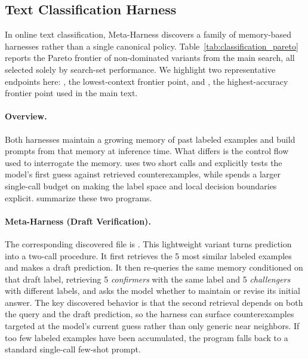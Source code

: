 \subsection{Text Classification Harness}
\label{app:classification-harnesses}

In online text classification, Meta-Harness discovers a family of memory-based harnesses rather than a single canonical policy.
Table~\ref{tab:classification_pareto} reports the Pareto frontier of non-dominated variants from the main search, all selected solely by search-set performance.
We highlight two representative endpoints here: , the lowest-context frontier point, and , the highest-accuracy frontier point used in the main text.

\paragraph{Overview.}
Both harnesses maintain a growing memory of past labeled examples and build prompts from that memory at inference time.
What differs is the control flow used to interrogate the memory.
 uses two short calls and explicitly tests the model's first guess against retrieved counterexamples, while  spends a larger single-call budget on making the label space and local decision boundaries explicit.
 summarize these two programs.

\paragraph{Meta-Harness (Draft Verification).}
The corresponding discovered file is .
This lightweight variant turns prediction into a two-call procedure.
It first retrieves the 5 most similar labeled examples and makes a draft prediction.
It then re-queries the same memory conditioned on that draft label, retrieving 5 \emph{confirmers} with the same label and 5 \emph{challengers} with different labels, and asks the model whether to maintain or revise its initial answer.
The key discovered behavior is that the second retrieval depends on both the query and the draft prediction, so the harness can surface counterexamples targeted at the model's current guess rather than only generic near neighbors.
If too few labeled examples have been accumulated, the program falls back to a standard single-call few-shot prompt.


